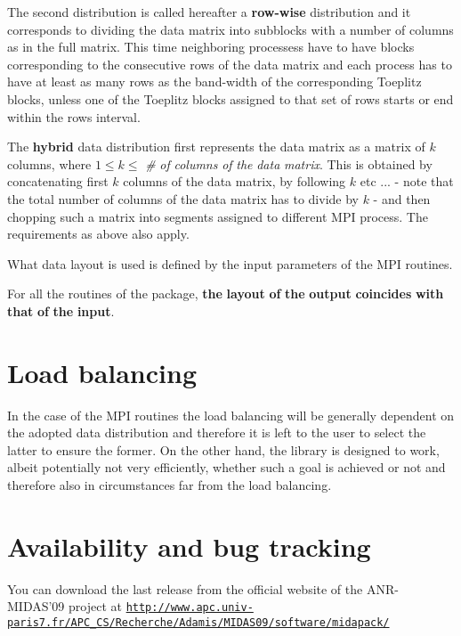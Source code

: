 The second distribution is called hereafter a {\bfseries row-\/wise} distribution and it corresponds to dividing the data matrix into subblocks with a number of columns as in the full matrix. This time neighboring processess have to have blocks corresponding to the consecutive rows of the data matrix and each process has to have at least as many rows as the band-\/width of the corresponding Toeplitz blocks, unless one of the Toeplitz blocks assigned to that set of rows starts or end within the rows interval.

The {\bfseries hybrid} data distribution first represents the data matrix as a matrix of $ k $ columns, where $ 1 \le k \le $ {\itshape \#} {\itshape of} {\itshape columns} {\itshape of} {\itshape the} {\itshape data} {\itshape matrix}. This is obtained by concatenating first $ k $ columns of the data matrix, by following $ k$ etc ... -\/ note that the total number of columns of the data matrix has to divide by $ k$ -\/ and then chopping such a matrix into segments assigned to different M\-P\-I process. The requirements as above also apply.

What data layout is used is defined by the input parameters of the M\-P\-I routines.

For all the routines of the package, {\bfseries the} {\bfseries layout} {\bfseries of} {\bfseries the} {\bfseries output} {\bfseries coincides} {\bfseries with} {\bfseries that} {\bfseries of} {\bfseries the} {\bfseries input}. \section{Load balancing}\label{toeplitz_loadbalancing}
In the case of the M\-P\-I routines the load balancing will be generally dependent on the adopted data distribution and therefore it is left to the user to select the latter to ensure the former. On the other hand, the library is designed to work, albeit potentially not very efficiently, whether such a goal is achieved or not and therefore also in circumstances far from the load balancing. \section{Availability and bug tracking}\label{toeplitz_avail}
You can download the last release from the official website of the A\-N\-R-\/\-M\-I\-D\-A\-S'09 project at \href{http://www.apc.univ-paris7.fr/APC_CS/Recherche/Adamis/MIDAS09/software/midapack/}{\tt http\-://www.\-apc.\-univ-\/paris7.\-fr/\-A\-P\-C\-\_\-\-C\-S/\-Recherche/\-Adamis/\-M\-I\-D\-A\-S09/software/midapack/}

